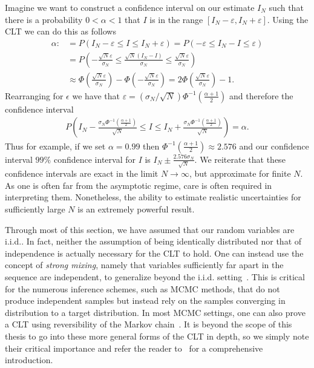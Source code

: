 Imagine we want to construct a confidence interval on our estimate $I_N$ such that there is
a probability $0<\alpha<1$ that $I$ is in the range $[I_N-\varepsilon,I_N+\varepsilon]$.  Using
the CLT we can do this as follows
\begin{align}
	\label{eq:inf:conf-int}
	\alpha :&= P(I_N-\varepsilon \le I \le I_N+\varepsilon ) = P(-\varepsilon \le I_N-I \le \varepsilon) \nonumber\\
	&= P\left(-\frac{\sqrt{N}\varepsilon}{\sigma_N}\le \frac{\sqrt{N}\left(I_N-I\right)}{\sigma_N}
				\le\frac{\sqrt{N}\varepsilon}{\sigma_N}\right) \nonumber\\
	&\approx \Phi\left(\frac{\sqrt{N}\varepsilon}{\sigma_N}\right)-
					\Phi\left(-\frac{\sqrt{N}\varepsilon}{\sigma_N}\right) = 2\Phi\left(\frac{\sqrt{N}\varepsilon}{\sigma_N}\right)-1.
\end{align}
Rearranging for $\epsilon$ we have that 
$\varepsilon = \left(\sigma_N/\sqrt{N}\right)\Phi^{-1}\left(\frac{\alpha+1}{2}\right)$
and therefore the confidence interval
\begin{align}
P\left(I_N-\frac{\sigma_N\Phi^{-1}\left(\frac{\alpha+1}{2}\right)}{\sqrt{N}} 
	\le I \le I_N+\frac{\sigma_N\Phi^{-1}\left(\frac{\alpha+1}{2}\right)}{\sqrt{N}} \right)  = \alpha.
\end{align}
Thus for example, if we set $\alpha=0.99$ then $\Phi^{-1}\left(\frac{\alpha+1}{2}\right)\approx 2.576$
and our confidence interval $99\%$ confidence interval for $I$ is
 $I_N \pm \frac{2.576 \sigma_N}{\sqrt{N}}$.  We reiterate that these confidence intervals are exact
 in the limit $N\to\infty$, but approximate for finite $N$.  As one is often far from the asymptotic
 regime, care is often required in interpreting them.  Nonetheless, the ability to
 estimate realistic uncertainties for sufficiently large $N$ is an extremely powerful result.
 
Through most of this section, we have assumed that our random variables are i.i.d..
In fact, neither the assumption of being identically distributed nor that of independence is actually
necessary for the CLT to hold.  One can instead use the concept of \emph{strong mixing}, namely
that variables sufficiently far apart in the sequence are independent, to generalize beyond the i.i.d.
setting~\citep{jones2004markov}.  This is critical for the numerous \mc inference schemes, 
such as MCMC methods, that
do not produce independent samples but instead rely on the samples converging in distribution
to a target distribution.  In most MCMC settings, one can also prove a CLT using reversibility of
the Markov chain~\citep{kipnis1986central}.
It is beyond the scope of this thesis to go into these more general forms of the CLT
in depth, so we simply note their critical importance and refer the reader to~\cite{durrett2010probability}
for a comprehensive introduction.